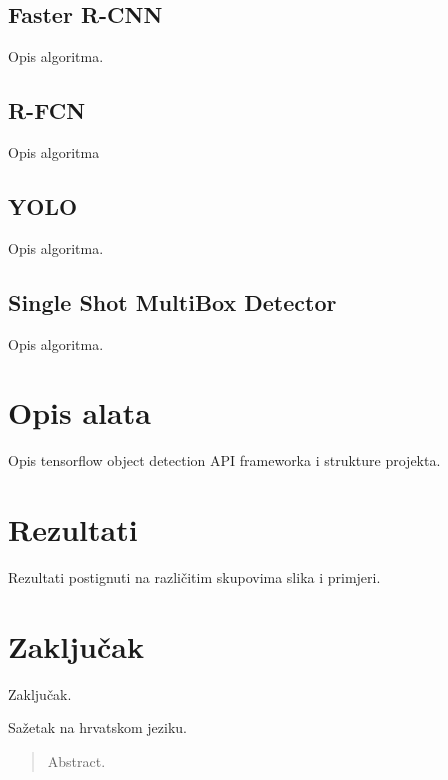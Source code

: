 \documentclass[times, utf8, diplomski]{fer}
\begin{document}
\section{Faster R-CNN}
Opis algoritma.

\section{R-FCN}
Opis algoritma

\section{YOLO}
Opis algoritma.

\section{Single Shot MultiBox Detector}
Opis algoritma.

\chapter{Opis alata}
Opis tensorflow object detection API frameworka i strukture projekta.

\chapter{Rezultati}
Rezultati postignuti na različitim skupovima slika i primjeri.



\chapter{Zaključak}
Zaključak.





\begin{sazetak}
Sažetak na hrvatskom jeziku.

\end{sazetak}

\begin{abstract}
Abstract.

\end{abstract}
\end{document}
